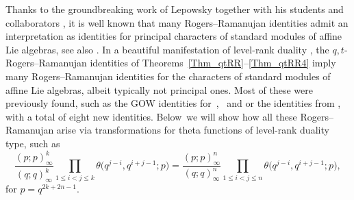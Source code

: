 \documentclass[pdftex]{sigma}
\numberwithin{equation}{section}
\renewcommand{\leq}{\leqslant}
\begin{document}
Thanks to the groundbreaking work of Lepowsky together with his
students and collaborators
\cite{BM94,Capparelli93,Capparelli96,CLM06,CMPP22,Kanade18,KR15,Lepowsky82,
LM78b,LM78a,LP85,LW81b,LW81a,LW82,LW84,MP87,MP99,Misra84,Nandi14},
it is well known that many Rogers--Ramanujan identities admit an
interpretation as identities for principal characters of standard modules
of affine Lie algebras, see also \cite[Section~5]{Sills18}.
In a beautiful manifestation of level-rank duality \cite{Frenkel82},
the $q,t$-Rogers--Ramanujan identities of
Theorems~\ref{Thm_qtRR}--\ref{Thm_qtRR4} imply many
Rogers--Ramanujan identities for the characters of
standard modules of affine Lie algebras, albeit typically not principal
ones.
Most of these were previously found, such as the GOW identities
for~,~ and
 \cite{GOW16} or the identities from \cite{RW21},
with a total of eight new identities.
Below~we will show how all these Rogers--Ramanujan arise via
transformations for theta functions of level-rank duality type,
such as
\begin{equation}\label{Eq_theta-duality}
\frac{(p;p)_{\infty}^k}{(q;q)_{\infty}^k}
\prod_{1\leq i<j\leq k} \theta\bigl(q^{j-i},q^{i+j-1};p\bigr)
=\frac{(p;p)_{\infty}^n}{(q;q)_{\infty}^n}
\prod_{1\leq i<j\leq n} \theta\bigl(q^{j-i},q^{i+j-1};p\bigr),
\end{equation}
for $p=q^{2k+2n-1}$.
\end{document}
